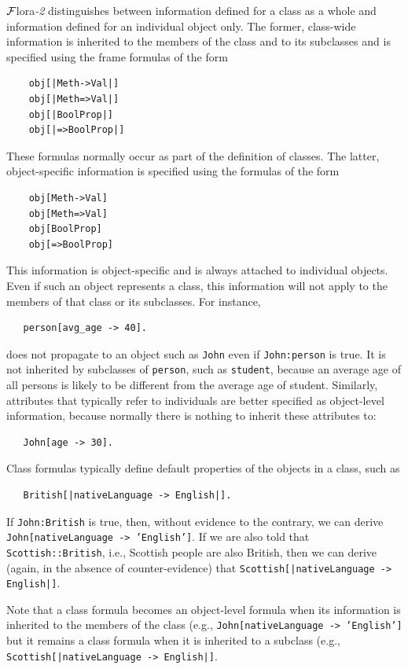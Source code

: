 \documentclass[11pt]{article}
\newcommand{\FLSYSTEM}{{\mbox{\sc ${\cal F}${lora}\rm\emph{-2}}}\xspace}
\begin{document}
\FLSYSTEM distinguishes between information defined for a class as a whole
and information defined for an individual object only.
The former, class-wide information is inherited to the members of the class and to its
subclasses and is specified using the frame formulas of the form
\begin{verbatim}
    obj[|Meth->Val|]
    obj[|Meth=>Val|]
    obj[|BoolProp|]
    obj[|=>BoolProp|]
\end{verbatim}
These formulas normally occur as part of the definition of classes.
The latter, object-specific information is specified using the formulas of
the form
\begin{verbatim}
    obj[Meth->Val]
    obj[Meth=>Val]
    obj[BoolProp]
    obj[=>BoolProp]
\end{verbatim}
This information is object-specific and is always attached to individual
objects. Even if such an object represents a class, this information
will not apply to the members of that class or its subclasses. For
instance,
\begin{verbatim}
   person[avg_age -> 40].  
\end{verbatim}
does not propagate to an object such as \texttt{John} even if
\texttt{John:person}  is true. It is not inherited by subclasses of
\texttt{person}, such as \texttt{student}, because an average age of all
persons is likely to be different from the average age of student.  
Similarly, attributes that typically refer to individuals are better
specified as object-level information, because normally there is nothing to
inherit these attributes to:
\begin{verbatim}
   John[age -> 30].  
\end{verbatim}
Class formulas typically define default properties 
of the objects in a class, such as
\begin{verbatim}
   British[|nativeLanguage -> English|].  
\end{verbatim}
If {\tt John:British} is true, then, without evidence to the contrary,
we can derive {\tt
  John[nativeLanguage -> 'English']}.
If we are also told that {\tt Scottish::British}, i.e., Scottish
  people are also British, then we can derive (again, in the absence of 
  counter-evidence) that {\tt Scottish[|nativeLanguage -> English|]}.
  
  Note that a class formula becomes an object-level formula when its
  information is inherited to the members of the class (e.g.,
  \texttt{John[nativeLanguage -> 'English']} but it remains a class formula
  when it is inherited to a subclass (e.g., \texttt{Scottish[|nativeLanguage ->
  English|]}.
\end{document}
